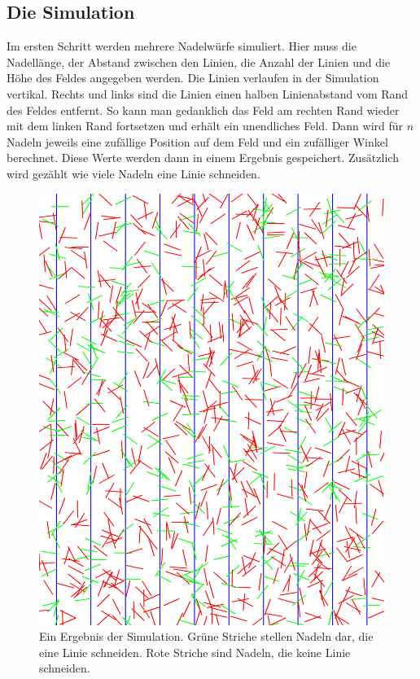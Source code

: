 \documentclass[10pt,twocolumn]{scrartcl}
\begin{document}
	\subsection{Die Simulation}
		\label{chap_sim_results}
		Im ersten Schritt werden mehrere Nadelwürfe simuliert. Hier muss die Nadellänge, der Abstand zwischen den Linien, die Anzahl der Linien und die Höhe des Feldes angegeben werden. Die Linien verlaufen in der Simulation vertikal. Rechts und links sind die Linien einen halben Linienabstand vom Rand des Feldes entfernt. So kann man gedanklich das Feld am rechten Rand wieder mit dem linken Rand fortsetzen und erhält ein unendliches Feld. Dann wird für $n$ Nadeln jeweils eine zufällige Position auf dem Feld und ein zufälliger Winkel berechnet. Diese Werte werden dann in einem Ergebnis gespeichert. Zusätzlich wird gezählt wie viele Nadeln eine Linie schneiden.

		\begin{figure}[htb]
			\centering
			\includegraphics[width=0.85\columnwidth]{images/needels.png}
			\caption{Ein Ergebnis der Simulation. Grüne Striche stellen Nadeln dar, die eine Linie schneiden. Rote Striche sind Nadeln, die keine Linie schneiden.}
			\label{fig:needels}
		\end{figure}
\end{document}

